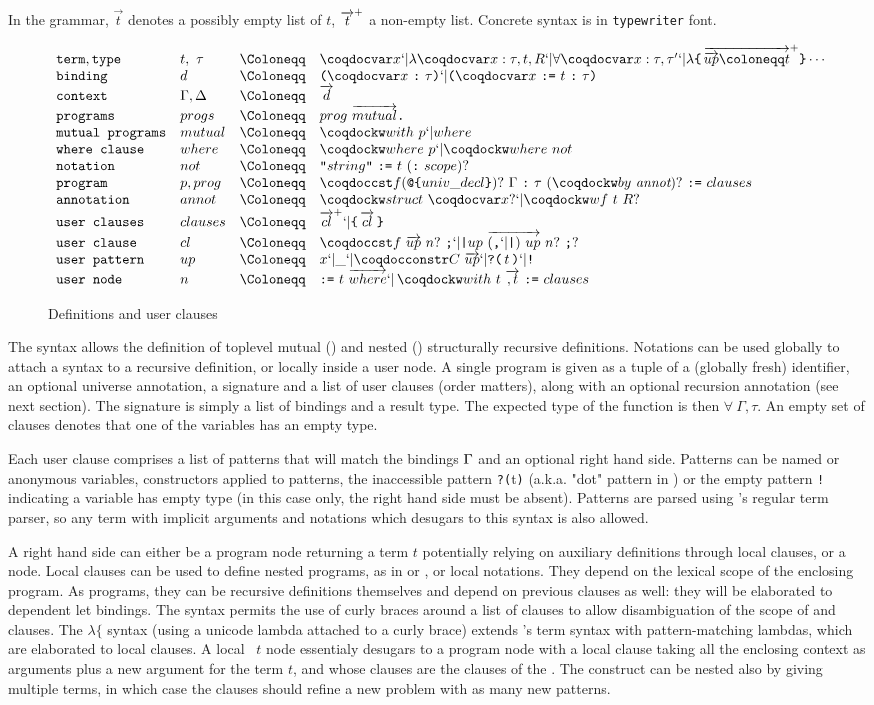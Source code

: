 In the grammar, $\vec{t}$ denotes a possibly empty list of $t$,
${\overrightarrow{t}}^{+}$ a non-empty list. Concrete syntax is in
\texttt{typewriter} font.
\begin{figure}[h]
\centering$\figdefs$
\caption{Definitions and user clauses}
\label{fig:usergram}
\end{figure}
The syntax allows the definition of toplevel mutual () and
nested () structurally recursive definitions. 
Notations can be used globally to attach a syntax to a 
recursive definition, or locally inside a user node. A single program is given as a tuple of a (globally
fresh) identifier, an optional universe annotation, 
a signature and a list of user clauses (order matters), along with an optional recursion annotation (see next
section). The signature is simply a list of bindings and a result
type. The expected type of the function  is then $\forall~\Gamma, \tau$.
An empty set of clauses denotes that one of the variables has an empty type.

Each user clause comprises a list of patterns that will match the
bindings $\Gamma$ and an optional right hand side. Patterns can be named or
anonymous variables, constructors applied to patterns, the inaccessible
pattern \texttt{?(}t\texttt{)} (a.k.a. "dot" pattern in \Agda) or the
empty pattern \texttt{!} indicating a variable has empty type (in this
case only, the right hand side must be absent). Patterns are parsed
using \Coq's regular term parser, so any term with implicit arguments
and notations which desugars to this syntax is also allowed.

A right hand side can either be a program node returning a term $t$
potentially relying on auxiliary definitions through local 
clauses, or a  node.  Local  clauses can be used to
define nested programs, as in \Haskell or \Agda, or local
notations. They depend on the lexical scope of the enclosing program. As
programs, they can be recursive definitions themselves and depend on
previous  clauses as well: they will be elaborated to
dependent let bindings. The syntax permits the use of curly braces
around a list of clauses to allow disambiguation of the scope of
 and  clauses. The $\lambda\{$ syntax (using a
unicode lambda attached to a curly brace) extends \Coq's term syntax
with pattern-matching lambdas, which are elaborated to local 
clauses. A local ~$t$ node essentialy desugars to a program
node with a local  clause taking all the enclosing context as
arguments plus a new argument for the term $t$, and whose clauses are
the clauses of the . The  construct can be nested also
by giving multiple terms, in which case the clauses should refine a new
problem with as many new patterns.

